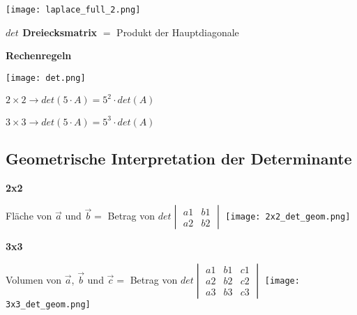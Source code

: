 \begin{multicols*}{3}
    {\texttt{[image: laplace\_full\_2.png]}}


    \textbf{$det$ Dreiecksmatrix}
    $ = $ Produkt der Hauptdiagonale
    \WhiteSpace

    \textbf{Rechenregeln}

    {\texttt{[image: det.png]}}

    $2\times 2 \rightarrow det(5 \cdot A) = 5^2 \cdot det(A)$

    $3\times 3 \rightarrow det(5 \cdot A) = 5^3 \cdot det(A)$

    \WhiteSpace
    \subsection{Geometrische Interpretation der Determinante }
    {\textbf{2x2}}

    {Fläche von $\vec{a} $ und $ \vec{b} = $ Betrag von $ det \begin{vmatrix} a1 & b1  \\ a2 & b2 \end{vmatrix} $}
    {\texttt{[image: 2x2\_det\_geom.png]}}




    \textbf{3x3}

    {Volumen von $\vec{a} $, $ \vec{b}$ und $\vec{c} = $ Betrag von $   det \begin{vmatrix} a1 & b1 & c1 \\ a2 & b2 & c2 \\ a3 & b3 & c3  \end{vmatrix}  $}
    {\texttt{[image: 3x3\_det\_geom.png]}}
    \mbox{}

\end{multicols*}


